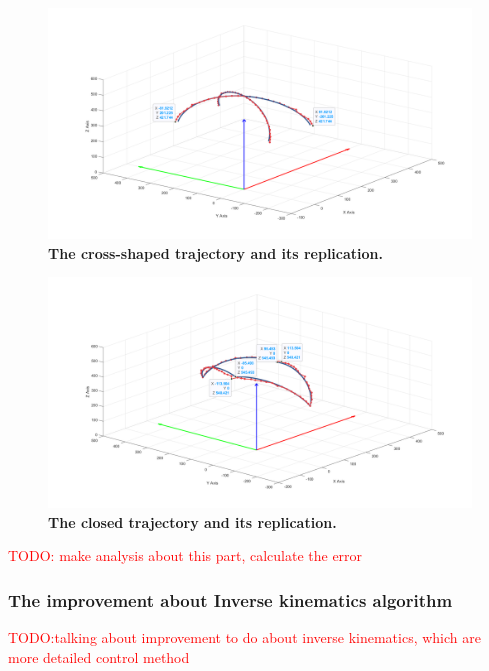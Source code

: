 \begin{figure}[H] %
    \centering %
    \captionsetup{labelsep=colon}
    \includegraphics[width=1.0\textwidth]{Image/Result/cross_trajectory_replication_with_label.png} 
    \caption[The cross-shaped trajectory and its replication by FABRIKc algorithm]
    {\centering \textbf{The cross-shaped trajectory and its replication.}}
    \label{fig:tr_cross}
\end{figure}
\begin{figure}[H] %
    \centering %
    \captionsetup{labelsep=colon}
    \includegraphics[width=1.0\textwidth]{Image/Result/circle_trajectory_replication_with_label.png} 
    \caption[The closed trajectory and its replication by FABRIKc algorithm]
    {\centering \textbf{The closed trajectory and its replication.}}
    \label{fig:clc_cross}
\end{figure}
\textcolor{red}{TODO: make analysis about this part, calculate the error}

\subsubsection{The improvement about Inverse kinematics algorithm}
\textcolor{red}{TODO:talking about improvement to do about inverse kinematics, which are more detailed control method}

